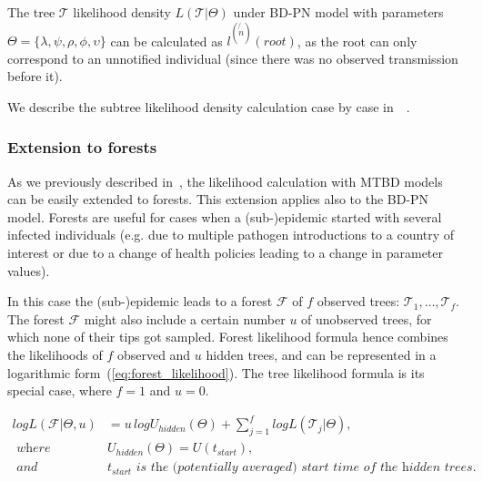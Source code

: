 \documentclass[10pt,letterpaper]{article}
\begin{document}
The tree $\mathscr{T}$ likelihood density $L(\mathscr{T}|\Theta)$ under BD-PN model with parameters $\Theta=\{\lambda, \psi, \rho, \phi, \upsilon\}$ can be calculated as $l^{(\not{n})}(root)$, as the root can only correspond to an unnotified individual (since there was no observed transmission before it).

We describe the subtree likelihood density calculation case by case in~~.




\bigskip





\subsubsection*{Extension to forests}

As we previously described in~\cite{zhukovaFastAccurateMaximumLikelihood2022}, the likelihood calculation with MTBD models can be easily extended to forests. This extension applies also to the BD-PN model. Forests are useful for cases when a (sub-)epidemic started with several infected individuals (e.g. due to multiple pathogen introductions to a country of interest or due to a change of health policies leading to a change in parameter values).

In this case the (sub-)epidemic leads to a forest $\mathscr{F}$ of $f$ observed trees: $\mathscr{T}_1, \ldots, \mathscr{T}_f$. The forest $\mathscr{F}$ might also include a certain number $u$ of unobserved trees, for which none of their tips got sampled.
Forest likelihood formula hence combines the likelihoods of $f$ observed and $u$ hidden trees, and can be represented in a logarithmic form~(\ref{eq:forest_likelihood}). The tree likelihood formula %
is its special case, where $f=1$ and $u=0$. 


\begin{equation}
\begin{split}
logL(\mathscr{F}|\Theta,u)&=u\,logU_{hidden}(\Theta) + \sum\limits_{j=1}^f logL(\mathscr{T}_j|\Theta), \\
\textit{ where }& U_{hidden}(\Theta)=U(t_{start}),\\
\textit{ and }& t_{start} \textit{ is the (potentially averaged) start time of the hidden trees.}
\end{split} \label{eq:forest_likelihood} 
\end{equation}
\end{document}
